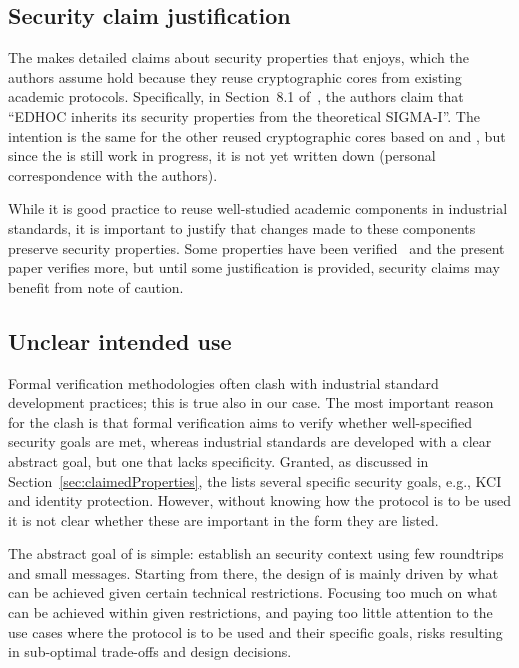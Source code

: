 \documentclass[runningheads, envcountsame, a4paper, draft, x11names]{llncs}
\newcommand{\spacehack}{\vspace{-1em}}
\newcommand{\fillhack}{\vspace{-0.5em}}
\begin{document}
\subsection{Security claim justification}
\label{sec:securityClaims}
\fillhack
The \mSpec{} makes detailed claims about security properties that \mEdhoc{}
enjoys, which the authors assume hold because they reuse cryptographic cores
from existing academic protocols.
%
Specifically, in Section~8.1 of~\cite{selander-lake-edhoc-01}, the authors
claim that ``EDHOC inherits its security properties from the theoretical
SIGMA-I''.
%
The intention is the same for the other reused cryptographic
cores based on \mOptls{} and \mNoise{}, but since the \mSpec{} is still work in
progress, it is not yet written down (personal correspondence with the authors).
%

While it is good practice to reuse well-studied academic components in
industrial standards, it is important to justify that changes made to these
components preserve security properties.
%
Some properties have been verified~\cite{DBLP:conf/secsr/BruniJPS18} and the
present paper verifies more, but until some justification is provided, security
claims may benefit from note of caution.
\spacehack
{}

\subsection{Unclear intended use}
\label{sec:unclearProtocolUse}
\fillhack
Formal verification methodologies often clash with industrial standard
development practices; this is true also in our case.
%
The most important reason for the clash is that formal verification aims to
verify whether well-specified security goals are met, whereas industrial
standards are developed with a clear abstract goal,
but one that lacks specificity.
%
Granted, as discussed in Section~\ref{sec:claimedProperties}, the \mSpec{} lists
several specific security goals, e.g., KCI and identity protection.
%
However, without knowing how the protocol is to be used
it is not clear whether these are important in the form they are listed.
%

The abstract goal of \mEdhoc{} is simple: establish an \mOscore{} security
context using few roundtrips and small messages.
%
Starting from there, the design of \mEdhoc{} is mainly driven by what
can be achieved given certain technical restrictions.
%
Focusing too much on what can be achieved within given restrictions, and paying
too little attention to the use cases where the
protocol is to be used and their specific goals, risks resulting in
sub-optimal trade-offs and design decisions.
%
\end{document}
